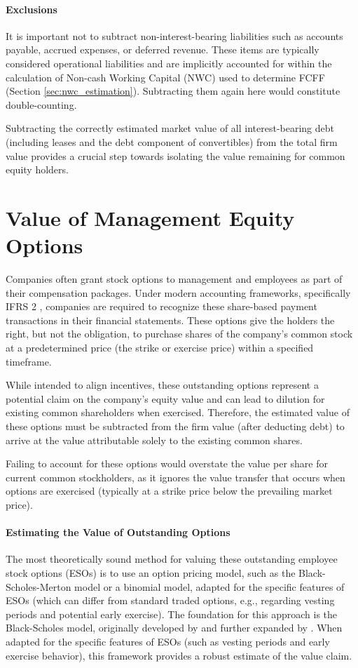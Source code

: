 \paragraph{Exclusions}
It is important not to subtract non-interest-bearing liabilities such as accounts payable, accrued expenses, or deferred revenue. These items are typically considered operational liabilities and are implicitly accounted for within the calculation of Non-cash Working Capital (NWC) used to determine FCFF (Section \ref{sec:nwc_estimation}). Subtracting them again here would constitute double-counting.

Subtracting the correctly estimated market value of all interest-bearing debt (including leases and the debt component of convertibles) from the total firm value provides a crucial step towards isolating the value remaining for common equity holders.

\section{Value of Management Equity Options}

Companies often grant stock options to management and employees as part of their compensation packages. Under modern accounting frameworks, specifically IFRS 2 \parencite{ifrs2}, companies are required to recognize these share-based payment transactions in their financial statements. These options give the holders the right, but not the obligation, to purchase shares of the company's common stock at a predetermined price (the strike or exercise price) within a specified timeframe.

While intended to align incentives, these outstanding options represent a potential claim on the company's equity value and can lead to dilution for existing common shareholders when exercised. Therefore, the estimated value of these options must be subtracted from the firm value (after deducting debt) to arrive at the value attributable solely to the existing common shares.

Failing to account for these options would overstate the value per share for current common stockholders, as it ignores the value transfer that occurs when options are exercised (typically at a strike price below the prevailing market price).

\paragraph{Estimating the Value of Outstanding Options}
The most theoretically sound method for valuing these outstanding employee stock options (ESOs) is to use an option pricing model, such as the Black-Scholes-Merton model or a binomial model, adapted for the specific features of ESOs (which can differ from standard traded options, e.g., regarding vesting periods and potential early exercise).
The foundation for this approach is the Black-Scholes model, originally developed by \textcite{black1973pricing} and further expanded by \textcite{merton1973theory}. When adapted for the specific features of ESOs (such as vesting periods and early exercise behavior), this framework provides a robust estimate of the value claim.

